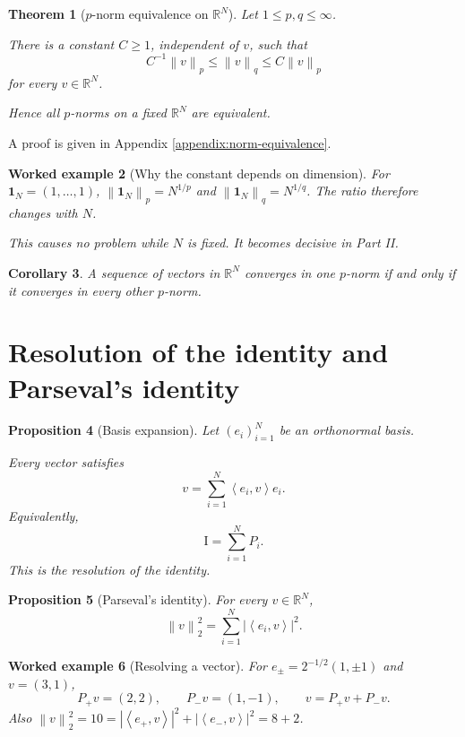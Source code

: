 \documentclass[11pt,a5paper,oneside,openany]{scrreprt}
\theoremstyle{notes}
\newtheorem{theorem}{Theorem}[section]
\newtheorem{proposition}[theorem]{Proposition}
\newtheorem{corollary}[theorem]{Corollary}
\theoremstyle{definitions}
\newtheorem{example}[theorem]{Worked example}
\newcommand{\R}{\mathbb{R}}
\newcommand{\ip}[2]{\left\langle #1,#2\right\rangle}
\newcommand{\norm}[1]{\left\lVert #1\right\rVert}
\newcommand{\Id}{\mathrm{I}}
\begin{document}
\begin{theorem}[$p$-norm equivalence on $\R^N$]
\label{thm:finite-norm-equivalence}
Let $1\le p,q\le\infty$.

There is a constant $C\ge1$, independent of $v$, such that
\[
  \boxed{C^{-1}\norm{v}_p\le\norm{v}_q\le C\norm{v}_p}
\]
for every $v\in\R^N$.

Hence all $p$-norms on a fixed $\R^N$ are equivalent.
\end{theorem}

A proof is given in Appendix \ref{appendix:norm-equivalence}.

\begin{example}[Why the constant depends on dimension]
For $\mathbf1_N=(1,\ldots,1)$,
$\norm{\mathbf1_N}_p=N^{1/p}$ and
$\norm{\mathbf1_N}_q=N^{1/q}$.  The ratio therefore changes with $N$.

This causes no problem while $N$ is fixed.  It becomes decisive in Part II.
\end{example}

\begin{corollary}
A sequence of vectors in $\R^N$ converges in one $p$-norm if and only if it
converges in every other $p$-norm.
\end{corollary}

\section{Resolution of the identity and Parseval's identity}

\begin{proposition}[Basis expansion]
Let $(e_i)_{i=1}^N$ be an orthonormal basis.

Every vector satisfies
\[
 v=\sum_{i=1}^{N}\ip{e_i}{v}e_i.
\]
Equivalently,
\[
  \boxed{\Id=\sum_{i=1}^{N}P_i}.
\]
This is the \emph{resolution of the identity}.
\end{proposition}

\begin{proposition}[Parseval's identity]
For every $v\in\R^N$,
\[
  \boxed{\norm{v}_2^2=\sum_{i=1}^{N}|\ip{e_i}{v}|^2}.
\]
\end{proposition}

\newpage
\begin{example}[Resolving a vector]
For $e_{\pm}=2^{-1/2}(1,\pm1)$ and $v=(3,1)$,
\[
 P_+v=(2,2),\qquad P_-v=(1,-1),\qquad v=P_+v+P_-v.
\]
Also $\norm{v}_2^2=10=|\ip{e_+}{v}|^2+|\ip{e_-}{v}|^2=8+2$.
\end{example}
\end{document}
